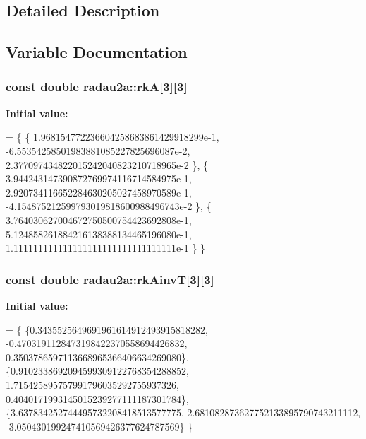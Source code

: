 \subsection{Detailed Description}


\subsection{Variable Documentation}
\subsubsection[{\texorpdfstring{rkA}{rkA}}]{\setlength{\rightskip}{0pt plus 5cm}const double radau2a\+::rkA\mbox{[}3\mbox{]}\mbox{[}3\mbox{]}\hspace{0.3cm}{\ttfamily [static]}}\hypertarget{group__Parameters_ga37314d1d93d3f053f469c40c5d42a43e}{}\label{group__Parameters_ga37314d1d93d3f053f469c40c5d42a43e}
{\bfseries Initial value\+:}
\begin{DoxyCode}
= \{ \{
     1.968154772236604258683861429918299e-1,
    -6.55354258501983881085227825696087e-2,
     2.377097434822015242040823210718965e-2
    \}, \{
     3.944243147390872769974116714584975e-1,
     2.920734116652284630205027458970589e-1,
    -4.154875212599793019818600988496743e-2
    \}, \{
     3.764030627004672750500754423692808e-1,
     5.124858261884216138388134465196080e-1,
     1.111111111111111111111111111111111e-1
    \}
\}
\end{DoxyCode}
\subsubsection[{\texorpdfstring{rk\+AinvT}{rkAinvT}}]{\setlength{\rightskip}{0pt plus 5cm}const double radau2a\+::rk\+AinvT\mbox{[}3\mbox{]}\mbox{[}3\mbox{]}\hspace{0.3cm}{\ttfamily [static]}}\hypertarget{group__Parameters_gaf7c73eb3be684541be92d125fef651bc}{}\label{group__Parameters_gaf7c73eb3be684541be92d125fef651bc}
{\bfseries Initial value\+:}
\begin{DoxyCode}
= \{
\{0.3435525649691961614912493915818282,
-0.4703191128473198422370558694426832,
0.3503786597113668965366406634269080\},
\{0.9102338692094599309122768354288852,
1.715425895757991796035292755937326,
0.4040171993145015239277111187301784\},
\{3.637834252744495732208418513577775,
2.681082873627752133895790743211112,
-3.050430199247410569426377624787569\}
\}
\end{DoxyCode}
